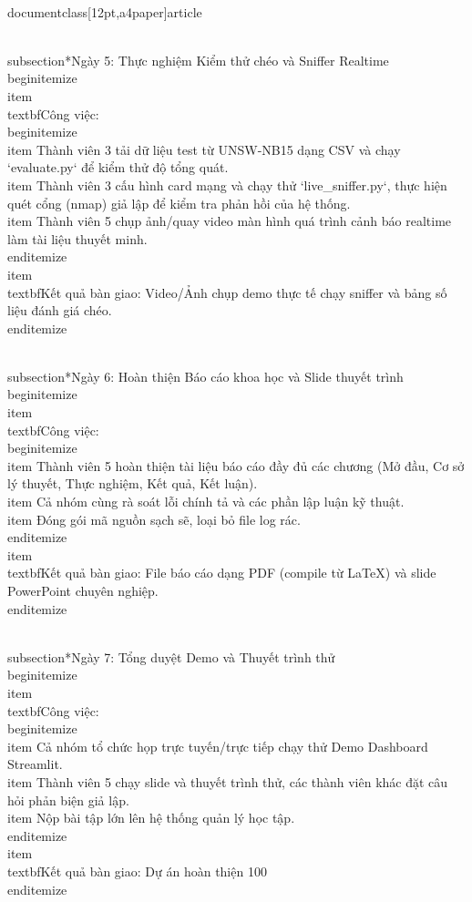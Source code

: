 \\documentclass[12pt,a4paper]{article}
\begin{document}
\\subsection*{Ngày 5: Thực nghiệm Kiểm thử chéo và Sniffer Realtime}
\\begin{itemize}
    \\item \\textbf{Công việc:}
    \\begin{itemize}
        \\item Thành viên 3 tải dữ liệu test từ UNSW-NB15 dạng CSV và chạy `evaluate.py` để kiểm thử độ tổng quát.
        \\item Thành viên 3 cấu hình card mạng và chạy thử `live_sniffer.py`, thực hiện quét cổng (nmap) giả lập để kiểm tra phản hồi của hệ thống.
        \\item Thành viên 5 chụp ảnh/quay video màn hình quá trình cảnh báo realtime làm tài liệu thuyết minh.
    \\end{itemize}
    \\item \\textbf{Kết quả bàn giao:} Video/Ảnh chụp demo thực tế chạy sniffer và bảng số liệu đánh giá chéo.
\\end{itemize}

\\subsection*{Ngày 6: Hoàn thiện Báo cáo khoa học và Slide thuyết trình}
\\begin{itemize}
    \\item \\textbf{Công việc:}
    \\begin{itemize}
        \\item Thành viên 5 hoàn thiện tài liệu báo cáo đầy đủ các chương (Mở đầu, Cơ sở lý thuyết, Thực nghiệm, Kết quả, Kết luận).
        \\item Cả nhóm cùng rà soát lỗi chính tả và các phần lập luận kỹ thuật.
        \\item Đóng gói mã nguồn sạch sẽ, loại bỏ file log rác.
    \\end{itemize}
    \\item \\textbf{Kết quả bàn giao:} File báo cáo dạng PDF (compile từ LaTeX) và slide PowerPoint chuyên nghiệp.
\\end{itemize}

\\subsection*{Ngày 7: Tổng duyệt Demo và Thuyết trình thử}
\\begin{itemize}
    \\item \\textbf{Công việc:}
    \\begin{itemize}
        \\item Cả nhóm tổ chức họp trực tuyến/trực tiếp chạy thử Demo Dashboard Streamlit.
        \\item Thành viên 5 chạy slide và thuyết trình thử, các thành viên khác đặt câu hỏi phản biện giả lập.
        \\item Nộp bài tập lớn lên hệ thống quản lý học tập.
    \\end{itemize}
    \\item \\textbf{Kết quả bàn giao:} Dự án hoàn thiện 100%
\\end{itemize}

\
\end{document}
